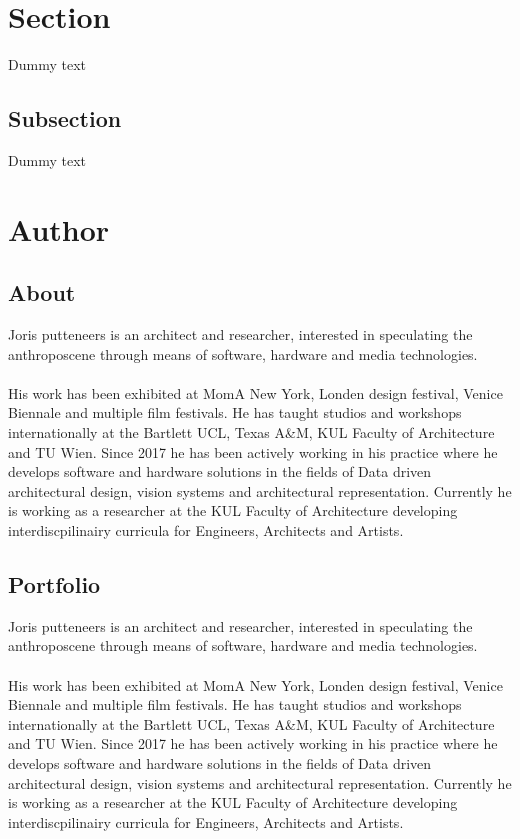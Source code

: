 \documentclass{article}
\begin{document}
\section{Section}
Dummy text
\subsection{Subsection}
Dummy text



\section{Author}


\subsection{About}
Joris putteneers is an architect and researcher, interested in speculating the anthroposcene through means of software, hardware and media technologies.\\
\\ 
His work has been exhibited at MomA New York, Londen design festival, Venice Biennale and multiple film festivals. He has taught studios and workshops internationally at the Bartlett UCL, Texas A\&M, KUL Faculty of Architecture and TU Wien. Since 2017 he has been actively working in his practice where he develops software and hardware solutions in the fields of Data driven architectural design, vision systems and architectural representation. Currently he is working as a researcher at the KUL Faculty of Architecture developing interdiscpilinairy curricula for Engineers, Architects and Artists. \\

\subsection{Portfolio}
Joris putteneers is an architect and researcher, interested in speculating the anthroposcene through means of software, hardware and media technologies.\\
\\ 
His work has been exhibited at MomA New York, Londen design festival, Venice Biennale and multiple film festivals. He has taught studios and workshops internationally at the Bartlett UCL, Texas A\&M, KUL Faculty of Architecture and TU Wien. Since 2017 he has been actively working in his practice where he develops software and hardware solutions in the fields of Data driven architectural design, vision systems and architectural representation. Currently he is working as a researcher at the KUL Faculty of Architecture developing interdiscpilinairy curricula for Engineers, Architects and Artists. \\
\end{document}
